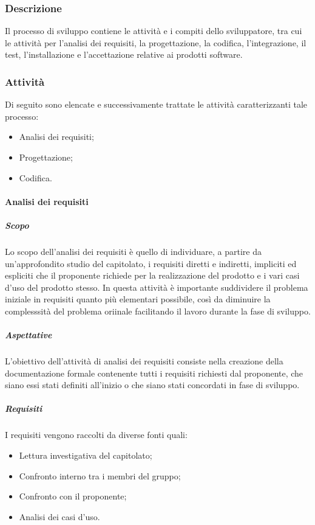     \subsubsection{Descrizione} \label{subsubsection:Sviluppo_Descrizione}
    Il processo di sviluppo contiene le attività e i compiti dello sviluppatore, tra cui le attività per l’analisi dei requisiti, la progettazione, 
    la codifica, l’integrazione, il test, l’installazione e l’accettazione relative ai prodotti software.

    \subsubsection{Attività} \label{subsubsection:Attivita'}
    Di seguito sono elencate e successivamente trattate le attività caratterizzanti tale processo:
    \begin{itemize}
        \item Analisi dei requisiti;
        \item Progettazione;
        \item Codifica.
    \end{itemize}
    
        \paragraph{Analisi dei requisiti} \label{paragraph:Analisi dei requisiti}
            \subparagraph{Scopo}
            Lo scopo dell’analisi dei requisiti è quello di individuare, a partire da un'approfondito studio del capitolato, i requisiti diretti e indiretti,
            impliciti ed espliciti che il proponente richiede per la realizzazione del prodotto e i vari casi d'uso del prodotto stesso. In questa attività è importante
            suddividere il problema iniziale in requisiti quanto più elementari possibile, così da diminuire la complesssità del problema oriinale
             facilitando il lavoro durante la fase di sviluppo.

            \subparagraph{Aspettative} \label{subparagraph:ADR_Aspettative}
            L’obiettivo dell’attività di analisi dei requisiti consiste nella creazione della documentazione formale contenente tutti i requisiti 
            richiesti dal proponente, che siano essi stati definiti all'inizio o che siano stati concordati in fase di sviluppo.

            \subparagraph{Requisiti} \label{subparagraph:Requisiti}
            I requisiti vengono raccolti da diverse fonti quali:
            \begin{itemize}
               \item Lettura investigativa del capitolato;
                \item Confronto interno tra i membri del gruppo;
                \item Confronto con il proponente;
                \item Analisi dei casi d'uso.
            \end{itemize}

